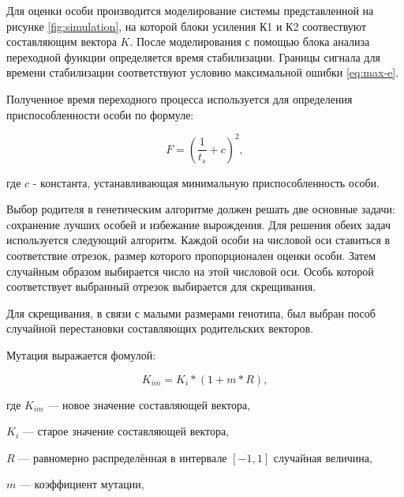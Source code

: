 \documentclass[russian,utf8,emptystyle,12pt]{eskdtext}
\begin{document}
    	Для оценки особи производится моделирование системы представленной на рисунке \ref{fig:simulation}, на которой блоки усиления К1 и К2 соотвествуют составляющим вектора $K$. После моделирования с помощью блока анализа переходной функции определяется время стабилизации. Границы сигнала для времени стабилизации соответствуют условию максимальной ошибки \ref{eq:max-e}.
                    
        Полученное время переходного процесса используется для определения приспособленности особи по формуле:
                    
        \begin{equation}
           F = (\frac{1}{t_s} + c)^2,     
           \label{eg:fittness}   
        \end{equation} 
        
 	    \begin{ESKDexplanation}
            \item[где ] $c$ - константа, устанавливающая минимальную приспособленность особи.    
        \end{ESKDexplanation}
            
    	Выбор родителя в генетическим алгоритме должен решать две основные задачи: cохранение лучших особей и избежание вырождения. Для решения обеих задач используется следующий алгоритм. Каждой особи  на числовой оси ставиться в соответствие отрезок, размер которого пропорционален оценки особи. Затем случайным образом выбирается число на этой числовой оси. Особь которой соответствует выбранный отрезок выбирается для скрещивания.
            
		Для скрещивания, в связи с малыми размерами генотипа, был выбран пособ случайной перестановки составляющих родительских векторов.
            
		Мутация выражается фомулой:
                        
        \begin{equation}
           K_{im} = K_i * (1 + m * R), 
           \label{eg:mutation}   
        \end{equation}    
                     
 	    \begin{ESKDexplanation}
            \item[где ] $K_{im}$ --- новое значение составляющей вектора,
            \item       $K_i$ --- старое значение составляющей вектора,
            \item       $R$ --- равномерно распределённая в интервале $[-1, 1]$ случайная величина,
            \item       $m$ --- коэффициент мутации,     
        \end{ESKDexplanation}
                    
\end{document}

